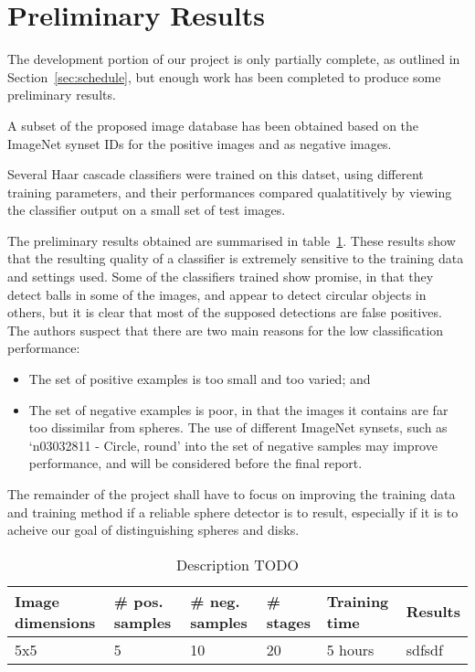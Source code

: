\documentclass[11pt]{scrartcl}
\begin{document}
    \section{Preliminary Results} {
    \label{sec:results}

        The development portion of our project is only partially complete, as outlined in Section~\ref{sec:schedule}, but enough work has been completed to produce some preliminary results.

        A subset of the proposed image database has been obtained based on the ImageNet synset IDs  for the positive images and  as negative images.

        Several Haar cascade classifiers were trained on this datset, using different training parameters, and their performances compared qualatitively by viewing the classifier output on a small set of test images.

        The preliminary results obtained are summarised in table~\ref{table:interim-results}.
        These results show that the resulting quality of a classifier is extremely sensitive to the training data and settings used.
        Some of the classifiers trained show promise, in that they detect balls in some of the images, and appear to detect circular objects in others, but it is clear that most of the supposed detections are false positives.
        The authors suspect that there are two main reasons for the low classification performance:

        \begin{itemize}
            \item The set of positive examples is too small and too varied; and
            \item The set of negative examples is poor, in that the images it contains are far too dissimilar from spheres.
                  The use of different ImageNet synsets, such as `n03032811 - Circle, round' into the set of negative samples may improve performance, and will be considered before the final report.
        \end{itemize}

        The remainder of the project shall have to focus on improving the training data and training method if a reliable sphere detector is to result, especially if it is to acheive our goal of distinguishing spheres and disks.


        \begin{table}[H]
            \caption{Description TODO}
            \label{table:interim-results}
            \begin{tabularx}{\textwidth}{llllll}
                \toprule
                \textbf{Image dimensions} & \textbf{\# pos. samples} & \textbf{\# neg. samples} & \textbf{\# stages} & \textbf{Training time} & \textbf{Results} \\
                \midrule
                5x5 & 5 & 10 & 20 & 5 hours & sdfsdf \\
                \bottomrule
            \end{tabularx}
        \end{table}

}
\end{document}
